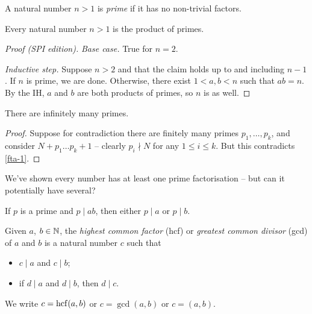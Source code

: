 \documentclass{../../template/note}
\begin{document}
    \begin{definition}
        A natural number \(n > 1\) is \emph{prime} if it has no non-trivial factors.
    \end{definition}

    
    \begin{proposition}
        Every natural number \(n > 1\) is the product of primes.
    \end{proposition}
    
    \begin{proof}[Proof (SPI edition)]

        \emph{Base case.} True for \(n=2\).

        \emph{Inductive step.} Suppose \(n > 2\) and that the claim holds up to and including \(n-1\). If \(n\) is prime, we are done. Otherwise, there exist \(1 < a, b < n\) such that \(ab = n\). By the IH, \(a\) and \(b\) are both products of primes, so \(n\) is as well.
    \end{proof}
    
    
    \begin{theorem}[Euclid]
        There are infinitely many primes.
    \end{theorem}
    
    \begin{proof}
        Suppose for contradiction there are finitely many primes \(p_1, \dots, p_k\), and consider \(N + p_1\dots p_k + 1\) -- clearly \(p_i \nmid N\) for any \(1 \leq i \leq k\). But this contradicts \cref{fta-1}.
    \end{proof}
    
    We've shown every number has at least one prime factorisation -- but can it potentially have several?

    \begin{proposition}
        If \(p\) is a prime and \(p \mid ab\), then either \(p \mid a\) or \(p \mid b\).
        \label{euclid-lemma}
    \end{proposition}
    
    \begin{definition}
        Given \(a\), \(b \in \mathbb N\), the \emph{highest common factor} (hcf) or \emph{greatest common divisor} (gcd) of \(a\) and \(b\) is a natural number \(c\) such that
        \begin{itemize}
            \item \(c \mid a\) and \(c \mid b\);
            \item if \(d \mid a\) and \(d \mid b\), then \(d \mid c\).
        \end{itemize}
        We write \(c = \operatorname{hcf}(a, b)\) or \(c = \gcd(a, b)\) or \(c = (a, b)\).        
    \end{definition}
    
\end{document}
